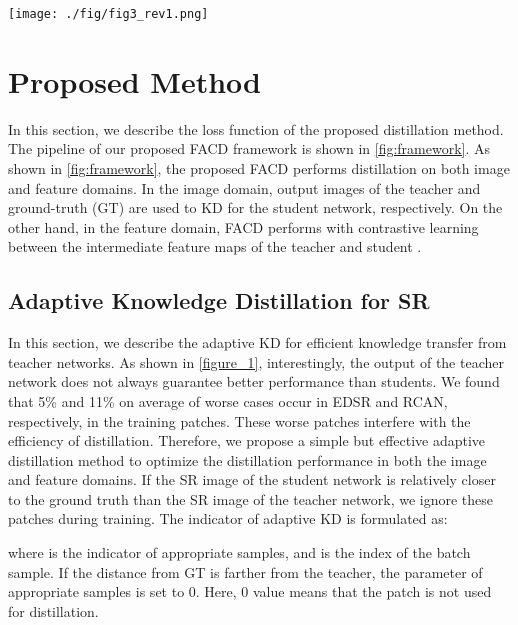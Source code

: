 \documentclass[10pt,twocolumn,letterpaper]{article}
\begin{document}
\begin{figure*}
\centering
\texttt{[image: ./fig/fig3\_rev1.png]}
\caption{Overall architecture of Feature-domain Adaptive Contrastive Distillation (FACD)\label{fig:framework}}
\end{figure*}
\section{Proposed Method}

In this section, we describe the loss function of the proposed distillation method. The pipeline of our proposed FACD framework is shown in \cref{fig:framework}. As shown in \cref{fig:framework}, the proposed FACD performs distillation on both image and feature domains. In the image domain, output images of the teacher and ground-truth (GT) are used to KD for the student network, respectively. On the other hand, in the feature domain, FACD performs with contrastive learning between the intermediate feature maps of the teacher and student \cite{fakd,lsfd}.

\subsection{Adaptive Knowledge Distillation for SR}
\label{adaptive}
In this section, we describe the adaptive KD for efficient knowledge transfer from teacher networks. As shown in \cref{figure_1}, interestingly, the output of the teacher network does not always guarantee better performance than students. We found that 5\% and 11\% on average of worse cases occur in EDSR and RCAN, respectively, in the training patches. These worse patches interfere with the efficiency of distillation. Therefore, we propose a simple but effective adaptive distillation method to optimize the distillation performance in both the image and feature domains. If the SR image of the student network is relatively closer to the ground truth than the SR image of the teacher network, we ignore these patches during training. The indicator of adaptive KD is formulated as:

where  is the indicator of appropriate samples, and  is the index of the batch sample. If the distance from GT is farther from the teacher, the parameter of appropriate samples  is set to 0. Here, 0 value means that the patch is not used for distillation.
\end{document}
